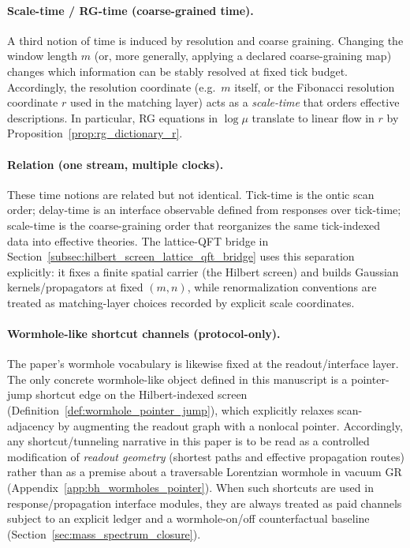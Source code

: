 \paragraph{Scale-time / RG-time (coarse-grained time).}
\InterfaceTag A third notion of time is induced by resolution and coarse graining.
Changing the window length $m$ (or, more generally, applying a declared coarse-graining map) changes which information can be stably resolved at fixed tick budget.
Accordingly, the resolution coordinate (e.g.\ $m$ itself, or the Fibonacci resolution coordinate $r$ used in the matching layer) acts as a \emph{scale-time} that orders effective descriptions.
In particular, RG equations in $\log\mu$ translate to linear flow in $r$ by Proposition~\ref{prop:rg_dictionary_r}.

\paragraph{Relation (one stream, multiple clocks).}
\AuditTag These time notions are related but not identical.
Tick-time is the ontic scan order; delay-time is an interface observable defined from responses over tick-time; scale-time is the coarse-graining order that reorganizes the same tick-indexed data into effective theories.
The lattice-QFT bridge in Section~\ref{subsec:hilbert_screen_lattice_qft_bridge} uses this separation explicitly: it fixes a finite spatial carrier (the Hilbert screen) and builds Gaussian kernels/propagators at fixed $(m,n)$, while renormalization conventions are treated as matching-layer choices recorded by explicit scale coordinates.

\paragraph{Wormhole-like shortcut channels (protocol-only).}
\InterfaceTag The paper's wormhole vocabulary is likewise fixed at the readout/interface layer.
The only concrete wormhole-like object defined in this manuscript is a pointer-jump shortcut edge on the Hilbert-indexed screen (Definition~\ref{def:wormhole_pointer_jump}), which explicitly relaxes scan-adjacency by augmenting the readout graph with a nonlocal pointer.
Accordingly, any shortcut/tunneling narrative in this paper is to be read as a controlled modification of \emph{readout geometry} (shortest paths and effective propagation routes) rather than as a premise about a traversable Lorentzian wormhole in vacuum GR (Appendix~\ref{app:bh_wormholes_pointer}).
When such shortcuts are used in response/propagation interface modules, they are always treated as paid channels subject to an explicit ledger and a wormhole-on/off counterfactual baseline (Section~\ref{sec:mass_spectrum_closure}).

